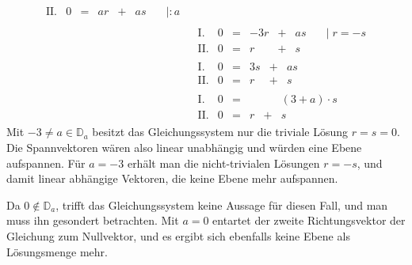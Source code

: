 \begin{exercise}
\begin{enumerate}[a)]
\begin{align*}
\begin{array}{r|rcrcrl}
                \text{II.} & 0 & = &  ar & + & as &\quad|:a
              \end{array}
              \\[2ex]
              &
              \begin{array}{r|rcrcrl}
                 \text{I.} & 0 & = & -3r & + & as &\quad|\;r=-s \\
                \text{II.} & 0 & = &   r & + &  s &\quad
              \end{array}
              \\[2ex]
              &
              \begin{array}{r|rcrcrl}
                 \text{I.} & 0 & = & 3s & + & as &\quad \\
                \text{II.} & 0 & = &  r & + &  s &\quad
              \end{array}
              \\[2ex]
              &
              \begin{array}{r|rcrcrl}
                 \text{I.} & 0 & = &   &   & (3+a)\cdot s &\quad \\
                \text{II.} & 0 & = & r & + &            s &\quad
              \end{array}
            \end{align*}
            Mit $-3\neq a\in\mathbb{D}_a$ besitzt das
            Gleichungssystem nur die triviale Lösung
            $r=s=0$.
            Die Spannvektoren wären also linear unabhängig
            und würden eine Ebene aufspannen.
            Für $a=-3$ erhält man die nicht-trivialen
            Lösungen $r=-s$, und damit linear
            abhängige Vektoren, die keine Ebene
            mehr aufspannen.\par
            Da $0\not\in\mathbb{D}_a$, trifft das
            Gleichungssystem keine Aussage für
            diesen Fall, und man muss ihn gesondert
            betrachten.
            Mit $a=0$ entartet der zweite Richtungsvektor
            der Gleichung zum Nullvektor, und es
            ergibt sich ebenfalls keine Ebene als
            Lösungsmenge mehr.
    \end{enumerate}
  \fi
\end{exercise}
